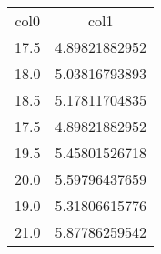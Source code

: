 \begin{table}
\begin{tabular}{cc}
col0 & col1 \\
17.5 & 4.89821882952 \\
18.0 & 5.03816793893 \\
18.5 & 5.17811704835 \\
17.5 & 4.89821882952 \\
19.5 & 5.45801526718 \\
20.0 & 5.59796437659 \\
19.0 & 5.31806615776 \\
21.0 & 5.87786259542 \\
\end{tabular}
\end{table}
